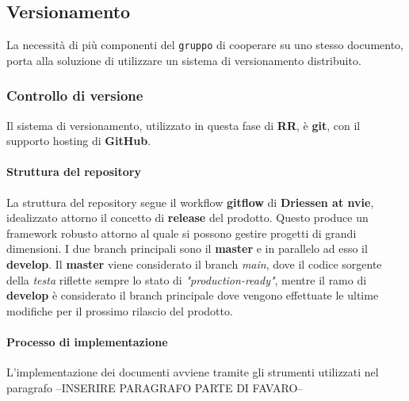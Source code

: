 \subsection{Versionamento}
La necessità di più componenti del \texttt{gruppo} di cooperare su uno stesso documento, porta alla soluzione di utilizzare un sistema di versionamento distribuito. 


\subsubsection{Controllo di versione}
Il sistema di versionamento, utilizzato in questa fase di \textbf{RR}, è \textbf{git}, con il supporto hosting di \textbf{GitHub}.

\paragraph{Struttura del repository} 
La struttura del repository segue il workflow \textbf{gitflow} di \textbf{Driessen at nvie}, idealizzato attorno il concetto di \textbf{release} del prodotto. Questo produce
un framework robusto attorno al quale si possono gestire progetti di grandi dimensioni. I due branch principali sono il \textbf{master} e in parallelo ad esso il \textbf{develop}. 
Il \textbf{master} viene considerato il branch \textit{main}, dove il codice sorgente della \textit{testa} riflette sempre lo stato di \textit{"production-ready"},
mentre il ramo di \textbf{develop} è considerato il branch principale dove vengono effettuate le ultime modifiche per il prossimo rilascio del prodotto. 


\paragraph{Processo di implementazione}
L'implementazione dei documenti avviene tramite gli strumenti utilizzati nel paragrafo --INSERIRE PARAGRAFO PARTE DI FAVARO--\\

